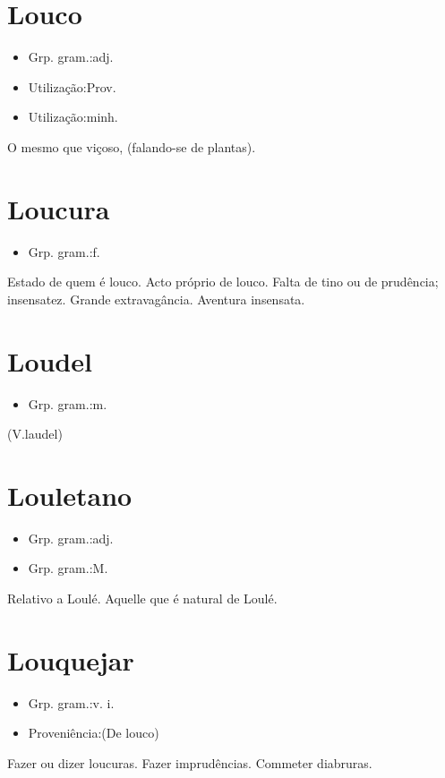 \section{Louco}
\begin{itemize}
\item {Grp. gram.:adj.}
\end{itemize}
\begin{itemize}
\item {Utilização:Prov.}
\end{itemize}
\begin{itemize}
\item {Utilização:minh.}
\end{itemize}
O mesmo que \textunderscore viçoso\textunderscore , (falando-se de plantas).
\section{Loucura}
\begin{itemize}
\item {Grp. gram.:f.}
\end{itemize}
Estado de quem é louco.
Acto próprio de louco.
Falta de tino ou de prudência; insensatez.
Grande extravagância.
Aventura insensata.
\section{Loudel}
\begin{itemize}
\item {Grp. gram.:m.}
\end{itemize}
(V.laudel)
\section{Louletano}
\begin{itemize}
\item {Grp. gram.:adj.}
\end{itemize}
\begin{itemize}
\item {Grp. gram.:M.}
\end{itemize}
Relativo a Loulé.
Aquelle que é natural de Loulé.
\section{Louquejar}
\begin{itemize}
\item {Grp. gram.:v. i.}
\end{itemize}
\begin{itemize}
\item {Proveniência:(De \textunderscore louco\textunderscore )}
\end{itemize}
Fazer ou dizer loucuras.
Fazer imprudências.
Commeter diabruras.

